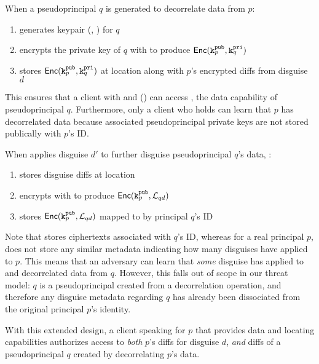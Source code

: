 When a pseudoprincipal $q$ is generated to decorrelate data from $p$: 
\begin{enumerate}
    \item \sys generates keypair (, ) for $q$
    \item encrypts the private key of $q$ with  to produce $\mathsf{Enc}(\texttt{\ensuremath{\texttt{k}^{\text{pub}}_{p}}}, \texttt{\ensuremath{\texttt{k}^{\text{pri}}_{q}}})$
    \item stores $\mathsf{Enc}(\texttt{\ensuremath{\texttt{k}^{\text{pub}}_{p}}}, \texttt{\ensuremath{\texttt{k}^{\text{pri}}_{q}}})$ at location  along with $p$'s encrypted diffs from disguise $d$
\end{enumerate}
This ensures that a client with  and  () can access , the data
capability of pseudoprincipal $q$.  Furthermore, only a client who holds  can learn
that $p$ has decorrelated data because associated pseudoprincipal private keys are not stored
publically with $p$'s ID.

When \sys applies disguise $d'$ to further disguise pseudoprincipal $q$'s data, \sys:
\begin{enumerate}
    \item stores disguise diffs  at location 
    \item encrypts  with  to produce $\mathsf{Enc}(\texttt{\ensuremath{\texttt{k}^{\text{pub}}_{p}}}, \mathcal{L}_{qd})$
    \item stores $\mathsf{Enc}(\texttt{\ensuremath{\texttt{k}^{\text{pub}}_{p}}}, \mathcal{L}_{qd})$ mapped to by principal $q$'s ID
\end{enumerate}
Note that \sys stores  ciphertexts associated with $q$'s ID, whereas for a real principal
$p$, \sys does not store any similar metadata indicating how many disguises have applied to $p$. 
This means that an adversary can learn that \emph{some} disguise has applied to and
decorrelated data from $q$. However, this falls out of scope in our threat model: $q$ is a
pseudoprincipal created from a decorrelation operation, and therefore any disguise metadata regarding $q$ has already been dissociated from
the original principal $p$'s identity.  

With this extended design, a client speaking for $p$ that provides data and locating capabilities%
authorizes access to \emph{both} $p$'s diffs for disguise $d$, \emph{and}
diffs of a pseudoprincipal $q$ created by
decorrelating $p$'s data. 

